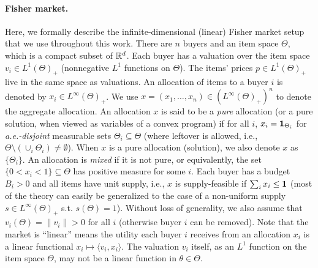 \paragraph{Fisher market.} 
Here, we formally describe the infinite-dimensional (linear) Fisher market setup that we use throughout this work. 
There are $n$ buyers and an item space $\Theta$, which is a compact subset of $\mathbb{R}^d$.  
Each buyer has a valuation over the item space $v_i\in L^1(\Theta)_+$ (nonnegative $L^1$ functions on $\Theta$). 
The items' prices $p\in L^1(\Theta)_+$ live in the same space as valuations. 
An allocation of items to a buyer $i$ is denoted by $x_i \in L^\infty(\Theta)_+$. We use $x = (x_1, \dots, x_n) \in (L^\infty(\Theta)_+)^n$ to denote the aggregate allocation. 
An allocation $x$ is said to be a \textit{pure} allocation (or a pure solution, when viewed as variables of a convex program) if for all $i$, $x_i = \mathbf{1}_{\Theta_i}$ for \textit{a.e.-disjoint} measurable sets $\Theta_i\subseteq \Theta$ (where leftover is allowed, i.e., $\Theta \setminus (\cup_i \Theta_i) \neq \emptyset$). 
When $x$ is a pure allocation (solution), we also denote $x$ as $\{\Theta_i\}$. 
An allocation is \textit{mixed} if it is not pure, or equivalently, the set $\{0< x_i < 1\} \subseteq \Theta$ has positive measure for some $i$. 
Each buyer has a budget $B_i > 0$ and all items have unit supply, i.e., $x$ is supply-feasible if $\sum_i x_i \leq \mathbf{1}$ 
(most of the theory can easily be generalized to the case of a non-uniform supply $s\in L^\infty(\Theta)_+$ s.t. $s(\Theta)=1$). Without loss of generality, we also assume that $v_i(\Theta) = \|v_i \| > 0$ for all $i$ (otherwise buyer $i$ can be removed).
Note that the market is ``linear'' means the utility each buyer $i$ receives from an allocation $x_i$ is a linear functional $ x_i \mapsto \langle v_i, x_i \rangle$. The valuation $v_i$ itself, as an $L^1$ function on the item space $\Theta$, may not be a linear function in $\theta\in \Theta$.
